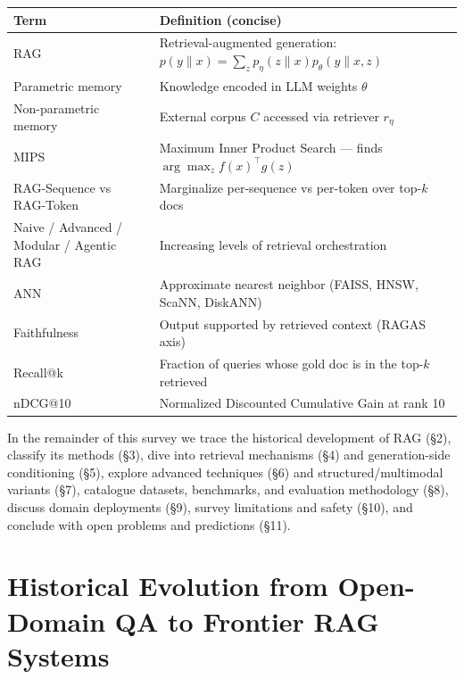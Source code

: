{\def\LTcaptype{none} %
\begin{longtable}[]{@{}
  >{\raggedright\arraybackslash}p{}
  >{\raggedright\arraybackslash}p{}@{}}
\toprule\noalign{}
\begin{minipage}[b]{\linewidth}\raggedright
Term
\end{minipage} & \begin{minipage}[b]{\linewidth}\raggedright
Definition (concise)
\end{minipage} \\
\midrule\noalign{}
\endhead
\bottomrule\noalign{}
\endlastfoot
RAG & Retrieval-augmented generation: \(p(y\|x) = \sum_z p_\eta(z\|x) p_\theta(y\|x, z)\) \\
Parametric memory & Knowledge encoded in LLM weights \(\theta\) \\
Non-parametric memory & External corpus \(C\) accessed via retriever \(r_\eta\) \\
MIPS & Maximum Inner Product Search --- finds \(\arg\max_z f(x)^\top g(z)\) \\
RAG-Sequence vs RAG-Token & Marginalize per-sequence vs per-token over top-\(k\) docs \\
Naive / Advanced / Modular / Agentic RAG & Increasing levels of retrieval orchestration \\
ANN & Approximate nearest neighbor (FAISS, HNSW, ScaNN, DiskANN) \\
Faithfulness & Output supported by retrieved context (RAGAS axis) \\
Recall@k & Fraction of queries whose gold doc is in the top-\(k\) retrieved \\
nDCG@10 & Normalized Discounted Cumulative Gain at rank 10 \\
\end{longtable}
}

In the remainder of this survey we trace the historical development of RAG (§2), classify its methods (§3), dive into retrieval mechanisms (§4) and generation-side conditioning (§5), explore advanced techniques (§6) and structured/multimodal variants (§7), catalogue datasets, benchmarks, and evaluation methodology (§8), discuss domain deployments (§9), survey limitations and safety (§10), and conclude with open problems and predictions (§11).

\section{Historical Evolution from Open-Domain QA to Frontier RAG Systems}\label{historical-evolution-from-open-domain-qa-to-frontier-rag-systems}

